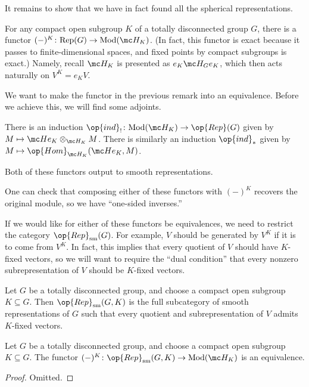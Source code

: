 \documentclass[../notes.tex]{subfiles}
\begin{document}
It remains to show that we have in fact found all the spherical representations.
\begin{remark}
	For any compact open subgroup $K$ of a totally disconnected group $G$, there is a functor $(-)^K\colon\mathrm{Rep}(G)\to\mathrm{Mod}(\mc H_K)$. (In fact, this functor is exact because it passes to finite-dimensional spaces, and fixed points by compact subgroups is exact.) Namely, recall $\mc H_K$ is presented as $e_K\mc H_Ge_K$, which then acts naturally on $V^K=e_KV$.
\end{remark}
We want to make the functor in the previous remark into an equivalence. Before we achieve this, we will find some adjoints.
\begin{definition}
	There is an induction $\op{ind}_!\colon\mathrm{Mod}(\mc H_K)\to\op{Rep}(G)$ given by $M\mapsto\mc He_K\otimes_{\mc H_K}M$. There is similarly an induction $\op{ind}_*$ given by $M\mapsto\op{Hom}_{\mc H_K}(\mc He_K,M)$.
\end{definition}
\begin{remark}
	Both of these functors output to smooth representations.
\end{remark}
\begin{remark}
	One can check that composing either of these functors with $(-)^K$ recovers the original module, so we have ``one-sided inverses.''
\end{remark}
If we would like for either of these functors be equivalences, we need to restrict the category $\op{Rep}_{\mathrm{sm}}(G)$. For example, $V$ should be generated by $V^K$ if it is to come from $V^K$. In fact, this implies that every quotient of $V$ should have $K$-fixed vectors, so we will want to require the ``dual condition'' that every nonzero subrepresentation of $V$ should be $K$-fixed vectors.
\begin{notation}
	Let $G$ be a totally disconnected group, and choose a compact open subgroup $K\subseteq G$. Then $\op{Rep}_{\mathrm{sm}}(G,K)$ is the full subcategory of smooth representations of $G$ such that every quotient and subrepresentation of $V$ admits $K$-fixed vectors.
\end{notation}
\begin{theorem}
	Let $G$ be a totally disconnected group, and choose a compact open subgroup $K\subseteq G$. The functor $(-)^K\colon\op{Rep}_{\mathrm{sm}}(G,K)\to\mathrm{Mod}(\mc H_K)$ is an equivalence.
\end{theorem}
\begin{proof}
	Omitted.
\end{proof}
\end{document}

